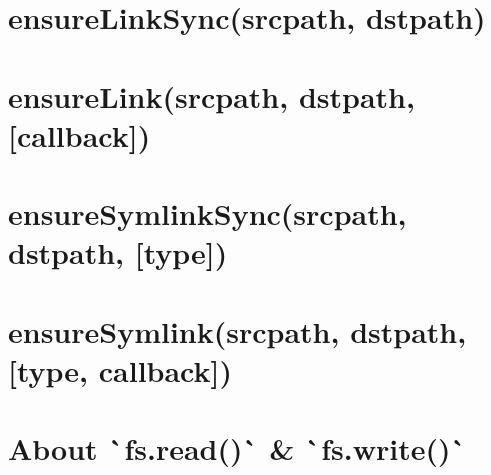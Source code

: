\documentclass[twoside]{book}
\newcommand{\+}{\discretionary{\mbox{\scriptsize$\hookleftarrow$}}{}{}}
\begin{document}
\chapter{ensure\+Link\+Sync(srcpath, dstpath)}
\label{md_dsmacc_vis_degree_node_modules_electron-packager_node_modules_electron-download_node_modules_fs-extra_docs_ensureLink-sync}

\chapter{ensure\+Link(srcpath, dstpath, \mbox{[}callback\mbox{]})}
\label{md_dsmacc_vis_degree_node_modules_electron-packager_node_modules_electron-download_node_modules_fs-extra_docs_ensureLink}

\chapter{ensure\+Symlink\+Sync(srcpath, dstpath, \mbox{[}type\mbox{]})}
\label{md_dsmacc_vis_degree_node_modules_electron-packager_node_modules_electron-download_node_modules_783362a4d88b0e58595a34fb53c42dc9}

\chapter{ensure\+Symlink(srcpath, dstpath, \mbox{[}type, callback\mbox{]})}
\label{md_dsmacc_vis_degree_node_modules_electron-packager_node_modules_electron-download_node_modules_fs-extra_docs_ensureSymlink}

\chapter{About \`{}fs.read()\`{} \& \`{}fs.write()\`{}}
\label{md_dsmacc_vis_degree_node_modules_electron-packager_node_modules_electron-download_node_modules_fs-extra_docs_fs-read-write}

\end{document}
